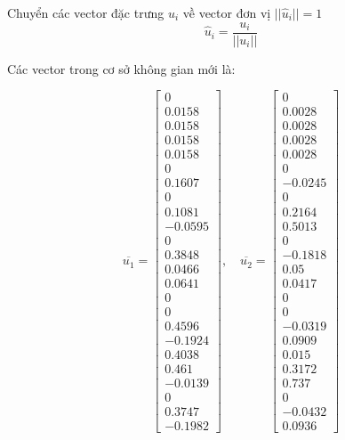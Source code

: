 Chuyển các vector đặc trưng $u_i$ về vector đơn vị $||\hat{u}_i|| = 1$
\[
\hat{u}_i = \frac{u_i}{||u_i||}
\]

Các vector trong cơ sở không gian mới là:

\[
\overline{u_1} = \begin{bmatrix}
0 \\
0.0158 \\
0.0158 \\
0.0158 \\
0.0158 \\
0 \\
0.1607 \\
0 \\
0.1081 \\
-0.0595 \\
0 \\
0.3848 \\
0.0466 \\
0.0641 \\
0 \\
0 \\
0.4596 \\
-0.1924 \\
0.4038 \\
0.461 \\
-0.0139 \\
0 \\
0.3747 \\
-0.1982
\end{bmatrix}, \quad
\overline{u_2} = \begin{bmatrix}
0 \\
0.0028 \\
0.0028 \\
0.0028 \\
0.0028 \\
0 \\
-0.0245 \\
0 \\
0.2164 \\
0.5013 \\
0 \\
-0.1818 \\
0.05 \\
0.0417 \\
0 \\
0 \\
-0.0319 \\
0.0909 \\
0.015 \\
0.3172 \\
0.737 \\
0 \\
-0.0432 \\
0.0936
\end{bmatrix}
\]

